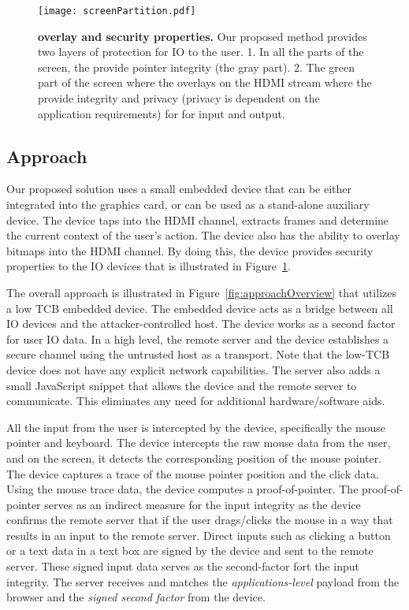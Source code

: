 \begin{figure}[t]
\centering
\texttt{[image: screenPartition.pdf]}
\caption{\textbf{\device overlay and security properties.} Our proposed method provides two layers of protection for IO to the user. 1. In all the parts of the screen, the \device provide pointer integrity (the gray part). 2. The green part of the screen where the \device overlays on the HDMI stream where the \device provide integrity and privacy (privacy is dependent on the application requirements) for for input and output.}
\label{fig:screenPartition}
\centering
\end{figure}

\subsection{Approach}

 Our proposed solution uses a small embedded device that can be either integrated into the graphics card, or can be used as a stand-alone auxiliary device. The device taps into the HDMI channel, extracts frames and determine the current context of the user's action. The device also has the ability to overlay bitmaps into the HDMI channel. By doing this, the device provides security properties to the IO devices that is illustrated in Figure~\ref{fig:screenPartition}.


The overall approach is illustrated in Figure~\ref{fig:approachOverview} that utilizes a low TCB embedded device. The embedded device acts as a bridge between all IO devices and the attacker-controlled host. The device works as a second factor for user IO data. In a high level, the remote server and the device establishes a secure channel using the untrusted host as a transport. Note that the low-TCB device does not have any explicit network capabilities. The server also adds a small JavaScript snippet that allows the device and the remote server to communicate. This eliminates any need for additional hardware/software aids.


All the input from the user is intercepted by the device, specifically the mouse pointer and keyboard. The device intercepts the raw mouse data from the user, and on the screen, it detects the corresponding position of the mouse pointer. The device captures a trace of the mouse pointer position and the click data. Using the mouse trace data, the device computes a proof-of-pointer. The proof-of-pointer serves as an indirect measure for the input integrity as the device confirms the remote server that if the user drags/clicks the mouse in a way that results in an input to the remote server. Direct inputs such as clicking a button or a text data in a text box are signed by the device and sent to the remote server. These signed input data serves as the second-factor fort the input integrity. The server receives and matches the \emph{applications-level} payload from the browser and the \emph{signed second factor} from the device. 


